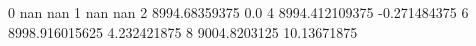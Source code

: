 0 nan nan
1 nan nan
2 8994.68359375 0.0
4 8994.412109375 -0.271484375
6 8998.916015625 4.232421875
8 9004.8203125 10.13671875
